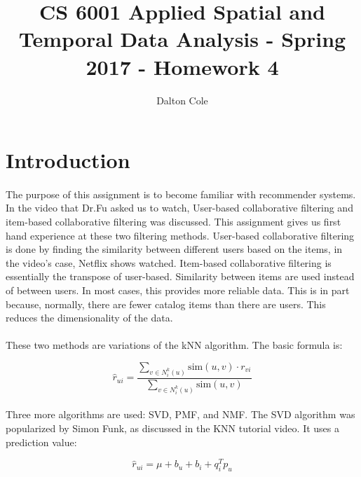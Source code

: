 \documentclass[times]{article}
\begin{document}
	\title{CS 6001 Applied Spatial and Temporal Data Analysis - Spring 2017 - Homework 4}
	\author{Dalton Cole}
	\date{}
	\maketitle

	\section{Introduction}
		\paragraph{}
		The purpose of this assignment is to become familiar with recommender systems. In the video that Dr.Fu asked us to watch, User-based collaborative filtering and item-based collaborative filtering was discussed. This assignment gives us first hand experience at these two filtering methods. User-based collaborative filtering is done by finding the similarity between different users based on the items, in the video's case, Netflix shows watched. Item-based collaborative filtering is essentially the transpose of user-based. Similarity between items are used instead of between users. In most cases, this provides more reliable data. This is in part because, normally, there are fewer catalog items than there are users. This reduces the dimensionality of the data.
		\paragraph{}
		These two methods are variations of the kNN algorithm. The basic formula is:

		\begin{equation*}
		\hat{r}_{ui} = \frac{
		\sum\limits_{v \in N^k_i(u)} \text{sim}(u, v) \cdot r_{vi}}
		{\sum\limits_{v \in N^k_i(u)} \text{sim}(u, v)}
		\end{equation*}

		\paragraph{}
		Three more algorithms are used: SVD, PMF, and NMF. The SVD algorithm was popularized by Simon Funk, as discussed in the KNN tutorial video. It uses a prediction value:

		\begin{equation*}
		\hat{r}_{ui} = \mu + b_u + b_i + q_i^Tp_u
		\end{equation*}
\end{document}
